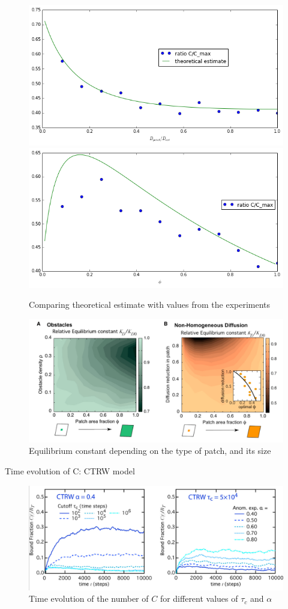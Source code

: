 \documentclass{beamer}
\begin{document}
\begin{frame}
\begin{figure}
\includegraphics[width=.5\textwidth]{Ceq_D0var}
\includegraphics[width=.5\textwidth]{Ceq_phivar}
\caption{Comparing theoretical estimate with values from the experiments}
\end{figure}
\end{frame}

\begin{frame}
\begin{figure}
\includegraphics[width=\textwidth]{2Dplots}
\caption{Equilibrium constant depending on the type of patch, and its size}
\end{figure}
\end{frame}



\begin{frame}{Time evolution of C: CTRW model}
\begin{figure}
\includegraphics[width=\textwidth]{CTRW}
\caption{Time evolution of the number of $C$ for different values of $\tau_c$ and $\alpha$}
\end{figure}
\end{frame}
\end{document}
